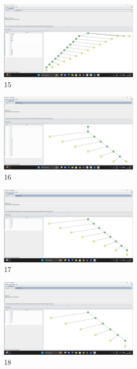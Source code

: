 \documentclass[a4paper,12pt]{article}
\begin{document}
    \begin{figure}[H]
        \centering
        \includegraphics[width=0.6\textwidth]{Aula03/Daniel/15.png}
        \caption*{15}
    \end{figure}
    \begin{figure}[H]
        \centering
        \includegraphics[width=0.6\textwidth]{Aula03/Daniel/16.png}
        \caption*{16}
    \end{figure}
    \begin{figure}[H]
        \centering
        \includegraphics[width=0.6\textwidth]{Aula03/Daniel/17.png}
        \caption*{17}
    \end{figure}
    \begin{figure}[H]
        \centering
        \includegraphics[width=0.6\textwidth]{Aula03/Daniel/18.png}
        \caption*{18}
    \end{figure}
\end{document}

